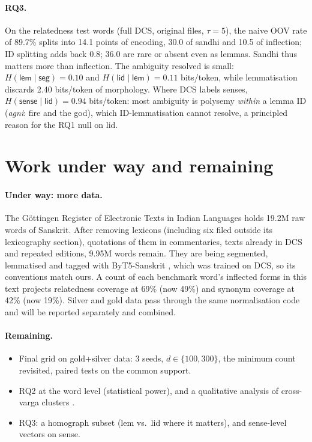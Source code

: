 \documentclass[11pt]{article}
\newcommand{\vk}[1]{\textsf{#1}}
\begin{document}
\paragraph{RQ3.} On the relatedness test words (full DCS, original files,
$\tau=5$), the naive OOV rate of 89.7\% splits into 14.1 points of encoding,
30.0 of sandhi and 10.5 of inflection; ID splitting adds back 0.8; 36.0 are
rare or absent even as lemmas. Sandhi thus matters more than inflection. The
ambiguity resolved is small: $H(\vk{lem}\mid\vk{seg})=0.10$ and
$H(\vk{lid}\mid\vk{lem})=0.11$ bits/token, while lemmatisation discards 2.40
bits/token of morphology. Where DCS labels senses, $H(\vk{sense}\mid
\vk{lid})=0.94$ bits/token: most ambiguity is polysemy \emph{within} a
lemma ID (\emph{agni}: fire and the god), which ID-lemmatisation cannot
resolve, a principled reason for the RQ1 null on \vk{lid}.

\section{Work under way and remaining}\label{sec:next}
\paragraph{Under way: more data.} The Göttingen Register of Electronic Texts in
Indian Languages \citep{gretil} holds 19.2M raw words of Sanskrit. After removing
lexicons (including six filed outside its lexicography section), quotations
of them in commentaries, texts already in DCS and repeated editions, 9.95M
words remain. They are being segmented, lemmatised and tagged with
ByT5-Sanskrit \citep{nehrdich2024byt5}, which was trained on DCS, so its
conventions match ours. A count of each benchmark word's inflected forms in
this text projects relatedness coverage at 69\% (now 49\%) and synonym
coverage at 42\% (now 19\%). Silver and gold data pass through the same
normalisation code and will be reported separately and combined.

\paragraph{Remaining.}
\begin{itemize}
\item Final grid on gold+silver data: 3 seeds, $d\in\{100,300\}$, the
  minimum count revisited, paired tests on the common support.
\item RQ2 at the word level (statistical power), and a qualitative analysis
  of cross-varga clusters \citep{agirre2009study}.
\item RQ3: a homograph subset (\vk{lem} vs.\ \vk{lid} where it matters), and
  sense-level vectors on \vk{sense}.
\end{itemize}
\end{document}

